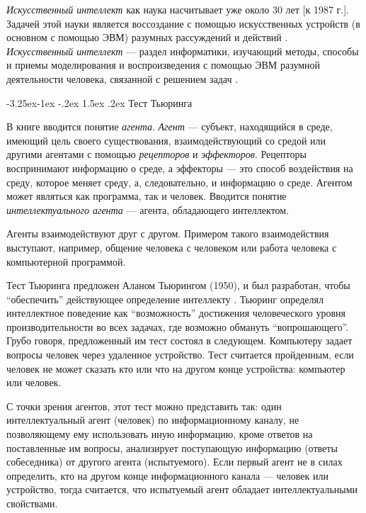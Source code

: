 \documentclass[12pt, openany, twoside]{book} %
\makeatletter
\renewcommand\subsection{\@startsection{subsection}{2}{\z@}%
                                     {-3.25ex\@plus -1ex \@minus -.2ex}%
                                     {1.5ex \@plus .2ex}%
                                     {\normalfont\normalsize\bfseries}}
\makeatother
\begin{document}
{\em Искусственный интеллект} как наука насчитывает уже около 30 лет [к 1987 г.]. Задачей этой науки является воссоздание с помощью искусственных устройств (в основном с помощью ЭВМ) разумных рассуждений и действий \cite{Lauriere}.\\
{\em Искусственный интеллект} --- раздел информатики, изучающий методы, способы и приемы моделирования и воспроизведения с помощью ЭВМ разумной деятельности человека, связанной с решением задач \cite{math_slov:88}.

\subsection{Тест Тьюринга}

В книге \cite{Russell} вводится понятие {\em агента}. {\em Агент} --- субъект, находящийся в среде, имеющий цель своего существования, взаимодействующий со средой или другими агентами с помощью {\em рецепторов} и {\em эффекторов}. Рецепторы воспринимают информацию о среде, а эффекторы --- это способ воздействия на среду, которое меняет среду, а, следовательно, и информацию о среде. Агентом может являться как программа, так и человек. Вводится понятие {\em интеллектуального агента} --- агента, обладающего интеллектом.

Агенты взаимодействуют друг с другом. Примером такого взаимодействия выступают, например, общение человека с человеком или работа человека с компьютерной программой.

Тест Тьюринга предложен Аланом Тьюрингом (1950), и был разработан, чтобы ``обеспечить'' действующее определение интеллекту \cite{Russell}. Тьюринг определял интеллектное поведение как ``возможность'' достижения человеческого уровня производительности во всех задачах, где возможно обмануть ``вопрошающего''. Грубо говоря, предложенный им тест состоял в следующем. Компьютеру задает вопросы человек через удаленное устройство. Тест считается пройденным, если человек не может сказать кто или что на другом конце устройства: компьютер или человек.

С точки зрения агентов, этот тест можно представить так: один интеллектуальный агент (человек) по информационному каналу, не позволяющему ему использовать иную информацию, кроме ответов на поставленные им вопросы, анализирует поступающую информацию (ответы собеседника) от другого агента (испытуемого). Если первый агент не в силах определить, кто на другом конце информационного канала --- человек или устройство, тогда считается, что испытуемый агент обладает интеллектуальными свойствами.
\end{document}
